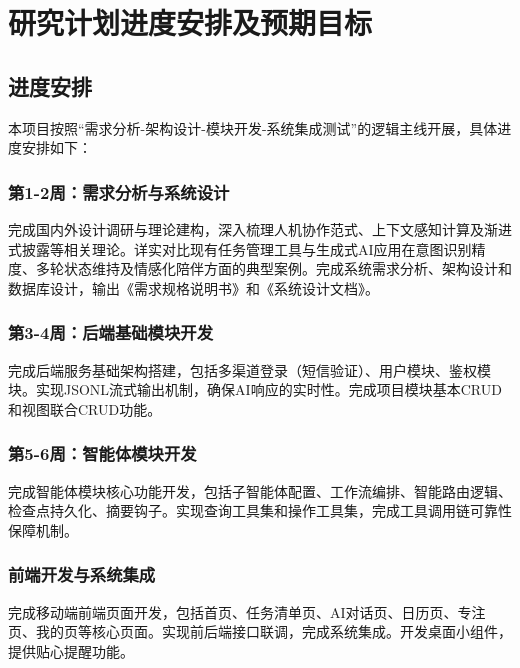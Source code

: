 \clearpage

\setlength{\parindent}{2em}

\section{研究计划进度安排及预期目标}

\subsection{进度安排}

本项目按照“需求分析-架构设计-模块开发-系统集成测试”的逻辑主线开展，具体进度安排如下：

\subsubsection{第1-2周：需求分析与系统设计}

\par 完成国内外设计调研与理论建构，深入梳理人机协作范式、上下文感知计算及渐进式披露等相关理论。详实对比现有任务管理工具与生成式AI应用在意图识别精度、多轮状态维持及情感化陪伴方面的典型案例。完成系统需求分析、架构设计和数据库设计，输出《需求规格说明书》和《系统设计文档》。

\subsubsection{第3-4周：后端基础模块开发}

\par 完成后端服务基础架构搭建，包括多渠道登录（短信验证）、用户模块、鉴权模块。实现JSONL流式输出机制，确保AI响应的实时性。完成项目模块基本CRUD和视图联合CRUD功能。

\subsubsection{第5-6周：智能体模块开发}

完成智能体模块核心功能开发，包括子智能体配置、工作流编排、智能路由逻辑、检查点持久化、摘要钩子。实现查询工具集和操作工具集，完成工具调用链可靠性保障机制。

\subsubsection{前端开发与系统集成}

\par 完成移动端前端页面开发，包括首页、任务清单页、AI对话页、日历页、专注页、我的页等核心页面。实现前后端接口联调，完成系统集成。开发桌面小组件，提供贴心提醒功能。

